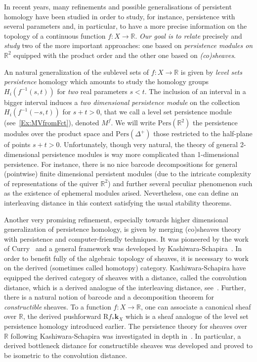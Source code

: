 \documentclass[a4paper, english, 11pt]{article}
\newcommand{\kk}[0]{\textbf{k}}
\newcommand{\0}{\vec{0}}
\newcommand{\R}[0]{\mathbb{R}}
\newcommand{\Pers}[0]{\text{Pers}}
\newcommand{\Rr}[0]{\text{R}}
\begin{document}
\medskip 

In recent years, many refinements and possible generalisations of persistent homology have been studied in order to study, for instance, persistence with several parameters and, in particular, to have a more precise information on the topology of a continuous function $f:X\to \R$. 
\emph{Our goal is to relate} precisely and \emph{study} two of the more important approaches: one based on \emph{persistence modules on $\R^2$} equipped with the product order and the other one based on \emph{(co)sheaves}.  

An natural generalization of the sublevel sets of $f:X\to \R$  is given by  \emph{level sets persistence} homology which amounts to study the homology groups $H_i(f^{-1}(s,t))$ for  \emph{two} real parameters $s<t$. The inclusion of an interval in a bigger interval induces a \emph{two dimensional persistence module} on the collection $H_i(f^{-1}(-s,t))$ for $s+t>0$, that we call a level set persistence module (see~\ref{Ex:MVfromFct}), denoted $M^f$.
We will write $\Pers(\R^2)$ the persistence modules over the product space and $\Pers(\Delta^+)$ those restricted to the half-plane of points $s+t>0$.
Unfortunately, though very natural, the theory of general 2-dimensional persistence modules is way more complicated than 1-dimensional persistence. For instance, there is no nice barcode decompositions for general (pointwise) finite dimensional persistent modules (due to the intricate complexity of representations of the quiver $\R^2$) and further several peculiar phenomenon such as the existence of ephemeral modules  arised.   Nevertheless, one can define an interleaving distance in this context satisfying the usual stability theorems. 

\medskip 

Another very promising refinement, especially towards higher dimensional generalization of persistence homology, is given by merging (co)sheaves theory with persistence and computer-friendly techniques. It was pioneered by the work of Curry~\cite{Curr14} and a general framework was developed by Kashiwara-Schapira~\cite{Kash18, KS18}. In order to benefit fully of the algebraic topology of sheaves, it is necessary to work on the derived (sometimes called homotopy) category. Kashiwara-Schapira have equipped the derived category of sheaves with a distance, called the convolution distance, which is a derived analogue of the interleaving distance, see~\cite{Kash18, BerkoukPetit}. Further, there is a natural notion of barcode and a decomposition theorem for \emph{constructible} sheaves. To a function $f:X\to \R$, one can associate a canonical sheaf over $\R$, the derived pushforward $\Rr f_* \kk_X$ which is a sheaf analogue of the level set persistence homology introduced earlier. 
The persistence theory for sheaves over $\R$ following Kashiwara-Schapira was investigated in depth in~\cite{Berk18}. In particular,  a derived bottleneck distance for constructible sheaves was developed and proved to be isometric to the convolution distance.  
\end{document}
